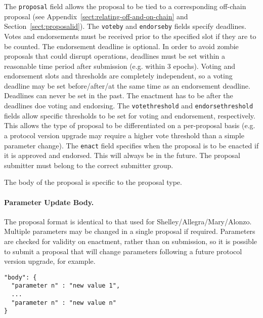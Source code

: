 The \texttt{proposal} field allows the proposal to be tied to a corresponding off-chain proposal (see Appendix~\ref{sect:relating-off-and-on-chain} and Section~\ref{sect:proposalid}).  The \texttt{voteby} and \texttt{endorseby} fields specify deadlines.
Votes and endorsements must be received prior to the specified slot if they are to be counted.  The endorsement deadline is optional.
In order to avoid zombie proposals that could disrupt operations, deadlines must be set within a reasonable time period after submission (e.g. within 3 epochs).
Voting and endorsement slots and thresholds are completely independent, so a voting deadline may be set before/after/at the same time as an endorsement deadline.
Deadlines can never be set in the past.
The enactment has to be after the deadlines doe voting and endorsing.
%
The \texttt{votethreshold} and \texttt{endorsethreshold} fields allow specific thresholds to be set for voting and endorsement, respectively.  This allows the type of proposal to be differentiated on a per-proposal basis
(e.g. a protocol version upgrade may require a higher vote threshold than a simple parameter change).
%
The \texttt{enact} field specifies when the proposal is to be enacted if it is approved and endorsed.  This will always be in the future.
%
The proposal submitter must belong to the correct submitter group.  

The body of the proposal is specific to the proposal type.

\newpage
\paragraph{Parameter Update Body.}  The proposal format is identical to that used for Shelley/Allegra/Mary/Alonzo.   Multiple parameters may be changed in a single proposal if required.
Parameters are checked for validity on enactment, rather than on submission, so it is possible to submit a proposal that will change parameters following a future protocol version upgrade, for example.


\begin{verbatim}
"body": {
  "parameter n" : "new value 1",
  ...
  "parameter n" : "new value n"
}
\end{verbatim}

